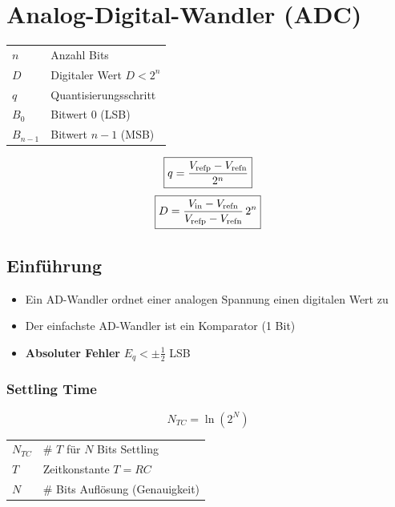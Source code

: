 \section{Analog-Digital-Wandler (ADC)}

\begin{minipage}[c]{0.48\columnwidth}
    \begin{tabular}{ll}
        $n$         & Anzahl Bits                       \\
        $D$         & Digitaler Wert \quad $D < 2^n$    \\
        $q$         & Quantisierungsschritt             \\
        $B_0$       & Bitwert 0 (LSB)                   \\
        $B_{n-1}$   & Bitwert $n-1$ (MSB)
    \end{tabular}
\end{minipage}
\hfill
\begin{minipage}[c]{0.48\columnwidth}
    $$ \boxed{ q = \frac{V_{\rm refp} - V_{\rm refn}}{2^n} } $$
    $$ \boxed{ D = \frac{V_{\rm in} - V_{\rm refn}}{V_{\rm refp} - V_{\rm refn}} \, 2^n } $$
\end{minipage}


\subsection{Einführung}

\begin{itemize}
    \item Ein AD-Wandler ordnet einer analogen Spannung einen digitalen Wert zu
    \item Der einfachste AD-Wandler ist ein Komparator (1 Bit)
    \item \textbf{Absoluter Fehler} $E_q < \pm \frac{1}{2}$ LSB 
\end{itemize}


\subsubsection{Settling Time}

\begin{minipage}[c]{0.35\columnwidth}
    $$ \boxed{ N_{TC} = \ln(2^N)} $$
\end{minipage}
\hfill
\begin{minipage}[c]{0.62\columnwidth}
    \begin{tabular}{ll}
        $N_{TC}$    & \# $T$ für $N$ Bits Settling      \\
        $T$         & Zeitkonstante $T = RC$            \\
        $N$         & \# Bits Auflösung (Genauigkeit)
    \end{tabular}
\end{minipage}

